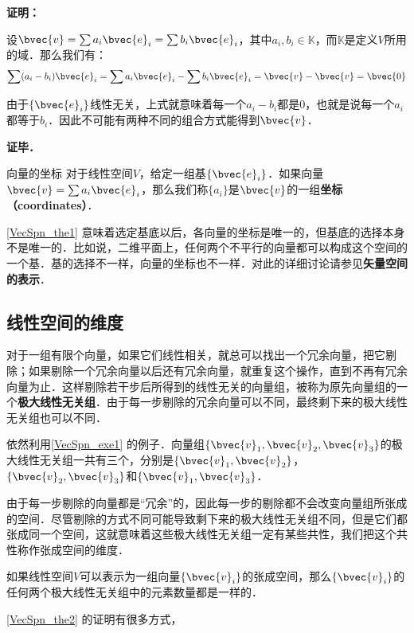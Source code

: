 \textbf{证明：}

设$\bvec{v}=\sum a_i\bvec{e}_i=\sum b_i\bvec{e}_i$，其中$a_i, b_i\in \mathbb{K}$，而$\mathbb{K}$是定义$V$所用的域．那么我们有：
\begin{equation}
\sum(a_i-b_i)\bvec{e}_i=\sum a_i\bvec{e}_i-\sum b_i\bvec{e}_i=\bvec{v}-\bvec{v}=\bvec{0}
\end{equation}

由于$\{\bvec{e}_i\}$线性无关，上式就意味着每一个$a_i-b_i$都是$0$，也就是说每一个$a_i$都等于$b_i$．因此不可能有两种不同的组合方式能得到$\bvec{v}$．

\textbf{证毕．}

\begin{definition}{向量的坐标}
对于线性空间$V$，给定一组基$\{\bvec{e}_i\}$．如果向量$\bvec{v}=\sum a_i\bvec{e}_i$，那么我们称$\{a_i\}$是$\bvec{v}$的一组\textbf{坐标（coordinates）}．
\end{definition}

\autoref{VecSpn_the1} 意味着选定基底以后，各向量的坐标是唯一的，但基底的选择本身不是唯一的．比如说，二维平面上，任何两个不平行的向量都可以构成这个空间的一个基．基的选择不一样，向量的坐标也不一样．对此的详细讨论请参见\textbf{矢量空间的表示}．

\subsection{线性空间的维度}

对于一组有限个向量，如果它们线性相关，就总可以找出一个冗余向量，把它剔除；如果剔除一个冗余向量以后还有冗余向量，就重复这个操作，直到不再有冗余向量为止．这样剔除若干步后所得到的线性无关的向量组，被称为原先向量组的一个\textbf{极大线性无关组}．由于每一步剔除的冗余向量可以不同，最终剩下来的极大线性无关组也可以不同．

\begin{example}{}
依然利用\autoref{VecSpn_exe1} 的例子．向量组$\{\bvec{v}_1, \bvec{v}_2, \bvec{v}_3\}$的极大线性无关组一共有三个，分别是$\{\bvec{v}_1, \bvec{v}_2\}$，$\{\bvec{v}_2, \bvec{v}_3\}$和$\{\bvec{v}_1, \bvec{v}_3\}$．
\end{example}

由于每一步剔除的向量都是“冗余”的，因此每一步的剔除都不会改变向量组所张成的空间．尽管剔除的方式不同可能导致剩下来的极大线性无关组不同，但是它们都张成同一个空间，这就意味着这些极大线性无关组一定有某些共性，我们把这个共性称作张成空间的维度．

\begin{theorem}{}\label{VecSpn_the2}
如果线性空间$V$可以表示为一组向量$\{\bvec{v}_i\}$的张成空间，那么$\{\bvec{v}_i\}$的任何两个极大线性无关组中的元素数量都是一样的．
\end{theorem}

\autoref{VecSpn_the2} 的证明有很多方式，

